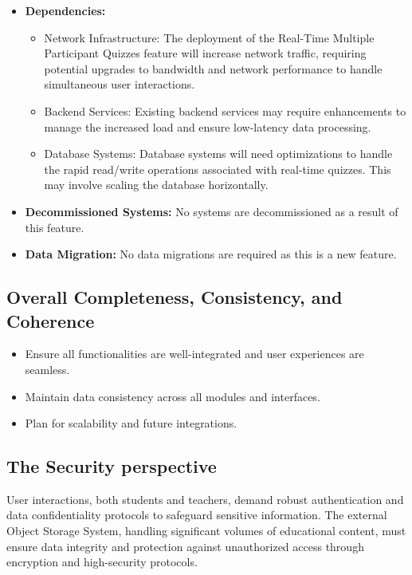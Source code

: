 \begin{itemize}
    \item \textbf{Dependencies:}
          \begin{itemize}
              \item Network Infrastructure: The deployment of the Real-Time Multiple Participant Quizzes feature will increase network traffic, requiring potential upgrades to bandwidth and network performance to handle simultaneous user interactions.
              \item Backend Services: Existing backend services may require enhancements to manage the increased load and ensure low-latency data processing.
              \item Database Systems: Database systems will need optimizations to handle the rapid read/write operations associated with real-time quizzes. This may involve scaling the database horizontally.
          \end{itemize}
    \item \textbf{Decommissioned Systems:} No systems are decommissioned as a result of this feature.
    \item \textbf{Data Migration:} No data migrations are required as this is a new feature.
\end{itemize}


\subsection{Overall Completeness, Consistency, and Coherence}

\begin{itemize}
    \item Ensure all functionalities are well-integrated and user experiences are seamless.
    \item Maintain data consistency across all modules and interfaces.
    \item Plan for scalability and future integrations.
\end{itemize}


\subsection{The Security perspective}

User interactions, both students and teachers, demand robust authentication and data confidentiality protocols to safeguard sensitive information. The external Object Storage System, handling significant volumes of educational content, must ensure data integrity and protection against unauthorized access through encryption and high-security protocols.


